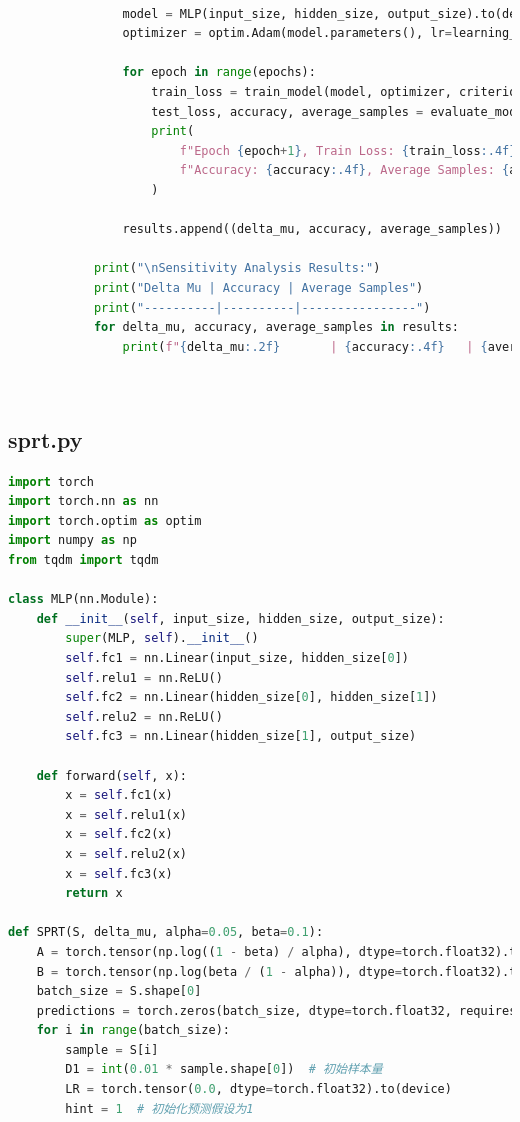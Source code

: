 \documentclass[withoutpreface,bwprint]{cumcmthesis} %
\begin{document}
\begin{appendices}
\begin{lstlisting}[language=python]
		
				model = MLP(input_size, hidden_size, output_size).to(device)
				optimizer = optim.Adam(model.parameters(), lr=learning_rate)
				
				for epoch in range(epochs):
					train_loss = train_model(model, optimizer, criterion, epoch, epochs, [delta_mu, delta_mu])
					test_loss, accuracy, average_samples = evaluate_model(model, criterion, [delta_mu, delta_mu])
					print(
						f"Epoch {epoch+1}, Train Loss: {train_loss:.4f}, Test Loss: {test_loss:.4f}, "
						f"Accuracy: {accuracy:.4f}, Average Samples: {average_samples:.2f}"
					)
				
				results.append((delta_mu, accuracy, average_samples))
		
			print("\nSensitivity Analysis Results:")
			print("Delta Mu | Accuracy | Average Samples")
			print("----------|----------|----------------")
			for delta_mu, accuracy, average_samples in results:
				print(f"{delta_mu:.2f}       | {accuracy:.4f}   | {average_samples:.2f}")
		
		
	 \end{lstlisting}
\subsection{sprt.py}
	 \begin{lstlisting}[language=python]
		import torch
import torch.nn as nn
import torch.optim as optim
import numpy as np
from tqdm import tqdm  

class MLP(nn.Module):
    def __init__(self, input_size, hidden_size, output_size):
        super(MLP, self).__init__()
        self.fc1 = nn.Linear(input_size, hidden_size[0])
        self.relu1 = nn.ReLU()
        self.fc2 = nn.Linear(hidden_size[0], hidden_size[1])
        self.relu2 = nn.ReLU()
        self.fc3 = nn.Linear(hidden_size[1], output_size)

    def forward(self, x):
        x = self.fc1(x)
        x = self.relu1(x)
        x = self.fc2(x)
        x = self.relu2(x)
        x = self.fc3(x)
        return x

def SPRT(S, delta_mu, alpha=0.05, beta=0.1):
    A = torch.tensor(np.log((1 - beta) / alpha), dtype=torch.float32).to(device)
    B = torch.tensor(np.log(beta / (1 - alpha)), dtype=torch.float32).to(device)
    batch_size = S.shape[0]
    predictions = torch.zeros(batch_size, dtype=torch.float32, requires_grad=True).to(device)
    for i in range(batch_size):
        sample = S[i]
        D1 = int(0.01 * sample.shape[0])  # 初始样本量
        LR = torch.tensor(0.0, dtype=torch.float32).to(device)
        hint = 1  # 初始化预测假设为1


\end{lstlisting}
\end{appendices}
\end{document}
